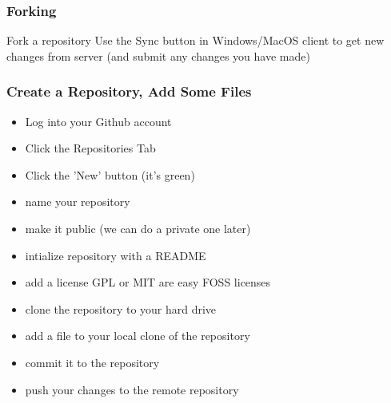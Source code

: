 \documentclass[xcolor=dvipsnames]{beamer}
\begin{document}

%





\begin{frame}
\frametitle{Forking}
Fork a repository
Use the Sync button in Windows/MacOS client to get new changes from server (and submit any changes you have made)
\end{frame}

\begin{frame}
\frametitle{Create a Repository, Add Some Files}
\begin{itemize}
\item Log into your Github account
\item Click the Repositories Tab
\item Click the 'New' button (it's green)
\item name your repository
\item make it public (we can do a private one later)
\item intialize repository with a README
\item add a license GPL or MIT are easy FOSS licenses
\item clone the repository to your hard drive
\item add a file to your local clone of the repository
\item commit it to the repository
\item push your changes to the remote repository
\end{itemize}
\end{frame}
\end{document}
